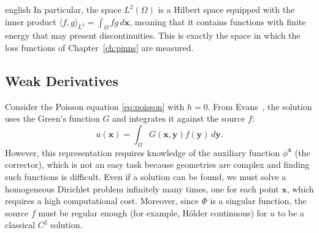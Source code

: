 \documentclass[0000.tex]{subfiles}
\begin{document}
\begin{hyphenrules}{english}
In particular, the space $L^2(\Omega)$ is a Hilbert space equipped with the inner product
$\langle f,g\rangle_{L^2}=\int_\Omega fg\,d\mathbf{x}$, meaning that it contains functions with finite energy that
may present discontinuities. This is exactly the space in which the loss functions of
Chapter~\ref{ch:pinns} are measured.

\subsection{Weak Derivatives}\label{subsec:weak}

Consider the Poisson equation \eqref{eq:poisson} with $h=0$. From Evans~\cite{evans2010}, the solution uses
the Green's function $G$ and integrates it against the source $f$:
\[
  u(\mathbf{x})=\int_\Omega G(\mathbf{x},\mathbf{y})f(\mathbf{y})\,d\mathbf{y}.
\]
However, this representation requires knowledge of the auxiliary function $\phi^{\mathbf{x}}$ (the corrector),
which is not an easy task because geometries are complex and finding such functions is difficult. Even
if a solution can be found, we must solve a homogeneous Dirichlet problem infinitely many times, one
for each point $\mathbf{x}$, which requires a high computational cost. Moreover, since $\Phi$ is a singular
function, the source $f$ must be regular enough (for example, Hölder continuous) for $u$ to be a
classical $C^2$ solution.


\end{hyphenrules}
\end{document}
